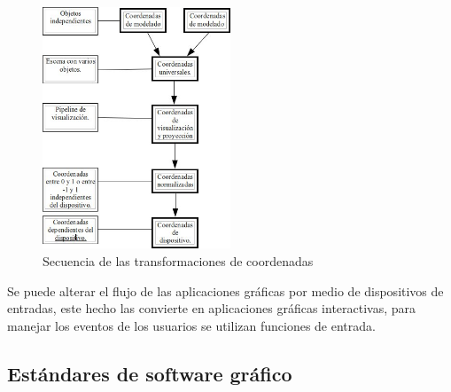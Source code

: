 \documentclass[12pt,a4paper,spanish,openany]{book}
\begin{document}
\begin{figure}
\begin{center}
\includegraphics[width=0.5\textwidth]{./img/secuenciaTransformaciones.jpg}
\caption{Secuencia de las transformaciones de coordenadas}
\end{center}
\end{figure}

Se puede alterar el flujo de las aplicaciones gráficas por medio de dispositivos
de entradas, este hecho las convierte en aplicaciones gráficas interactivas,
para manejar los eventos de los usuarios se utilizan funciones de entrada.

\subsection{Estándares de software gráfico}
\end{document}
